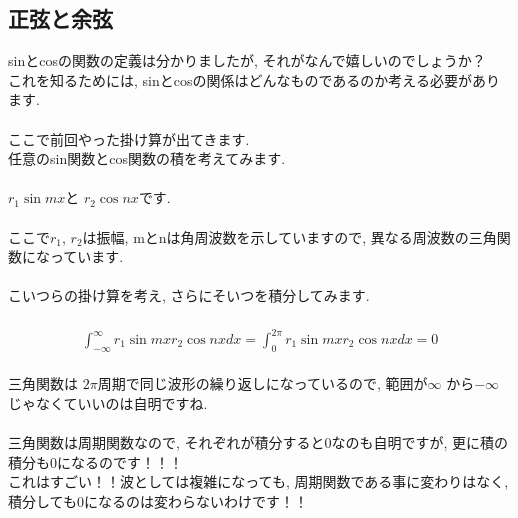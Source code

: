 \documentclass[11pt,a4paper]{jreport}
\begin{document}
\subsection{正弦と余弦}
sinとcosの関数の定義は分かりましたが, それがなんで嬉しいのでしょうか？\\
これを知るためには, sinとcosの関係はどんなものであるのか考える必要があります.\\
\\
ここで前回やった掛け算が出てきます. \\
任意のsin関数とcos関数の積を考えてみます.\\
\\
$r_1\sin mx $と $r_2\cos nx $です.\\
\\
ここで$r_1$, $r_2$は振幅, mとnは角周波数を示していますので, 異なる周波数の三角関数になっています.\\
\\
こいつらの掛け算を考え, さらにそいつを積分してみます.\\
\\
\begin{eqnarray}
  \int^\infty_{-\infty} r_1\sin mx r_2\cos nx dx = \int^{2\pi}_0 r_1\sin mx r_2\cos nx dx = 0
\end{eqnarray}
\\
三角関数は $2\pi$周期で同じ波形の繰り返しになっているので, 範囲が$\infty$ から$-\infty$じゃなくていいのは自明ですね.\\
\\
三角関数は周期関数なので, それぞれが積分すると0なのも自明ですが, 更に積の積分も0になるのです！！！\\
これはすごい！！波としては複雑になっても, 周期関数である事に変わりはなく, 積分しても0になるのは変わらないわけです！！\\
\end{document}
